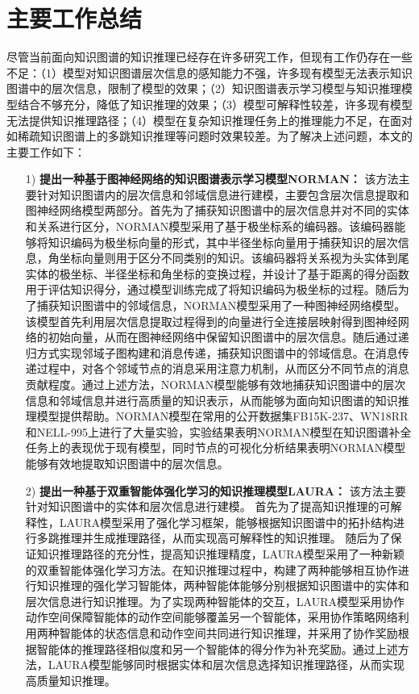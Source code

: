 \documentclass[algorithmlist, AutoFakeBold, AutoFakeSlant, figurelist, tablelist, nomlist, engineering, openany]{seuthesix} %
\begin{document}
\section{主要工作总结}
尽管当前面向知识图谱的知识推理已经存在许多研究工作，但现有工作仍存在一些不足：（1）模型对知识图谱层次信息的感知能力不强，许多现有模型无法表示知识图谱中的层次信息，限制了模型的效果；（2）知识图谱表示学习模型与知识推理模型结合不够充分，降低了知识推理的效果；（3）模型可解释性较差，许多现有模型无法提供知识推理路径；（4）模型在复杂知识推理任务上的推理能力不足，在面对如稀疏知识图谱上的多跳知识推理等问题时效果较差。为了解决上述问题，本文的主要工作如下：
\begin{itemize}
  \item [1)]\textbf{提出一种基于图神经网络的知识图谱表示学习模型NORMAN：}
  该方法主要针对知识图谱内的层次信息和邻域信息进行建模，主要包含层次信息提取和图神经网络模型两部分。首先为了捕获知识图谱中的层次信息并对不同的实体和关系进行区分，NORMAN模型采用了基于极坐标系的编码器。该编码器能够将知识编码为极坐标向量的形式，其中半径坐标向量用于捕获知识的层次信息，角坐标向量则用于区分不同类别的知识。该编码器将关系视为头实体到尾实体的极坐标、半径坐标和角坐标的变换过程，并设计了基于距离的得分函数用于评估知识得分，通过模型训练完成了将知识编码为极坐标的过程。随后为了捕获知识图谱中的邻域信息，NORMAN模型采用了一种图神经网络模型。该模型首先利用层次信息提取过程得到的向量进行全连接层映射得到图神经网络的初始向量，从而在图神经网络中保留知识图谱中的层次信息。随后通过递归方式实现邻域子图构建和消息传递，捕获知识图谱中的邻域信息。在消息传递过程中，对各个邻域节点的消息采用注意力机制，从而区分不同节点的消息贡献程度。通过上述方法，NORMAN模型能够有效地捕获知识图谱中的层次信息和邻域信息并进行高质量的知识表示，从而能够为面向知识图谱的知识推理模型提供帮助。NORMAN模型在常用的公开数据集FB15K-237、WN18RR和NELL-995上进行了大量实验，实验结果表明NORMAN模型在知识图谱补全任务上的表现优于现有模型，同时节点的可视化分析结果表明NORMAN模型能够有效地提取知识图谱中的层次信息。
  \item [2)]\textbf{提出一种基于双重智能体强化学习的知识推理模型LAURA：}
  该方法主要针对知识图谱中的实体和层次信息进行建模。
  首先为了提高知识推理的可解释性，LAURA模型采用了强化学习框架，能够根据知识图谱中的拓扑结构进行多跳推理并生成推理路径，从而实现高可解释性的知识推理。
  随后为了保证知识推理路径的充分性，提高知识推理精度，LAURA模型采用了一种新颖的双重智能体强化学习方法。在知识推理过程中，构建了两种能够相互协作进行知识推理的强化学习智能体，两种智能体能够分别根据知识图谱中的实体和层次信息进行知识推理。为了实现两种智能体的交互，LAURA模型采用协作动作空间保障智能体的动作空间能够覆盖另一个智能体，采用协作策略网络利用两种智能体的状态信息和动作空间共同进行知识推理，并采用了协作奖励根据智能体的推理路径相似度和另一个智能体的得分作为补充奖励。通过上述方法，LAURA模型能够同时根据实体和层次信息选择知识推理路径，从而实现高质量知识推理。

\end{itemize}
\end{document}
